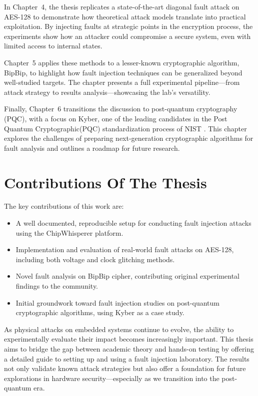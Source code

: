 In Chapter~4, the thesis replicates a state-of-the-art diagonal fault attack on AES-128 to demonstrate how theoretical attack models translate into practical exploitation. By injecting faults at strategic points in the encryption process, the experiments show how an attacker could compromise a secure system, even with limited access to internal states.

Chapter~5 applies these methods to a lesser-known cryptographic algorithm, BipBip, to highlight how fault injection techniques can be generalized beyond well-studied targets. The chapter presents a full experimental pipeline—from attack strategy to results analysis—showcasing the lab’s versatility.

Finally, Chapter~6 transitions the discussion to post-quantum cryptography (PQC), with a focus on Kyber, one of the leading candidates in the Post Quantum Cryptographic(PQC) standardization process of NIST . This chapter explores the challenges of preparing next-generation cryptographic algorithms for fault analysis and outlines a roadmap for future research.

\section*{Contributions Of The Thesis}

The key contributions of this work are:
\begin{itemize}
    \item A well documented, reproducible setup for conducting fault injection attacks using the ChipWhisperer platform.
    \item Implementation and evaluation of real-world fault attacks on AES-128, including both voltage and clock glitching methods.
    \item Novel fault analysis on BipBip cipher, contributing original experimental findings to the community.
    \item Initial groundwork toward fault injection studies on post-quantum cryptographic algorithms, using Kyber as a case study.
\end{itemize}


As physical attacks on embedded systems continue to evolve, the ability to experimentally evaluate their impact becomes increasingly important. This thesis aims to bridge the gap between academic theory and hands-on testing by offering a detailed guide to setting up and using a fault injection laboratory. The results not only validate known attack strategies but also offer a foundation for future explorations in hardware security—especially as we transition into the post-quantum era.



